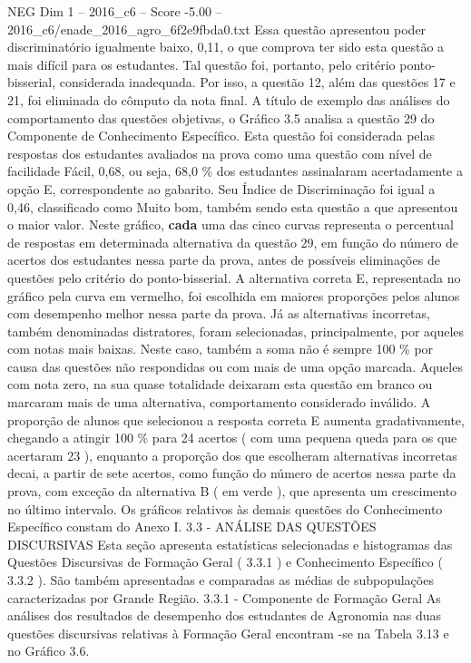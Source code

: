 \begin{textsample}{NEG Dim 1 – 2016\_c6 – Score -5.00 – 2016\_c6/enade\_2016\_agro\_6f2e9fbda0.txt}
Essa questão apresentou poder discriminatório igualmente baixo, 0,11, o que comprova ter sido esta questão a mais difícil para os estudantes.
Tal questão foi, portanto, pelo critério ponto-bisserial, considerada inadequada.
Por isso, a questão 12, além das questões 17 e 21, foi eliminada do cômputo da nota final.
A título de exemplo das análises do comportamento das questões objetivas, o Gráfico 3.5 analisa a questão 29 do Componente de Conhecimento Específico.
Esta questão foi considerada pelas respostas dos estudantes avaliados na prova como uma questão com nível de facilidade Fácil, 0,68, ou seja, 68,0 \% dos estudantes assinalaram acertadamente a opção E, correspondente ao gabarito.
Seu Índice de Discriminação foi igual a 0,46, classificado como Muito bom, também sendo esta questão a que apresentou o maior valor.
Neste gráfico, \textbf{cada} uma das cinco curvas representa o percentual de respostas em determinada alternativa da questão 29, em função do número de acertos dos estudantes nessa parte da prova, antes de possíveis eliminações de questões pelo critério do ponto-bisserial.
A alternativa correta E, representada no gráfico pela curva em vermelho, foi escolhida em maiores proporções pelos alunos com desempenho melhor nessa parte da prova.
Já as alternativas incorretas, também denominadas distratores, foram selecionadas, principalmente, por aqueles com notas mais baixas.
Neste caso, também a soma não é sempre 100 \% por causa das questões não respondidas ou com mais de uma opção marcada.
Aqueles com nota zero, na sua quase totalidade deixaram esta questão em branco ou marcaram mais de uma alternativa, comportamento considerado inválido.
A proporção de alunos que selecionou a resposta correta E aumenta gradativamente, chegando a atingir 100 \% para 24 acertos ( com uma pequena queda para os que acertaram 23 ), enquanto a proporção dos que escolheram alternativas incorretas decai, a partir de sete acertos, como função do número de acertos nessa parte da prova, com exceção da alternativa B ( em verde ), que apresenta um crescimento no último intervalo.
Os gráficos relativos às demais questões do Conhecimento Específico constam do Anexo I. 3.3 - ANÁLISE DAS QUESTÕES DISCURSIVAS Esta seção apresenta estatísticas selecionadas e histogramas das Questões Discursivas de Formação Geral ( 3.3.1 ) e Conhecimento Específico ( 3.3.2 ).
São também apresentadas e comparadas as médias de subpopulações caracterizadas por Grande Região. 3.3.1 - Componente de Formação Geral As análises dos resultados de desempenho dos estudantes de Agronomia nas duas questões discursivas relativas à Formação Geral encontram -se na Tabela 3.13 e no Gráfico 3.6.

\end{textsample}
